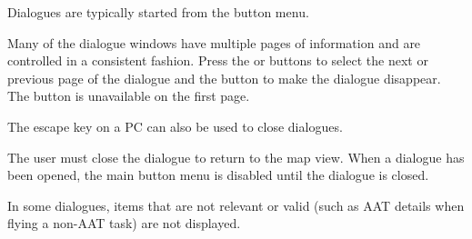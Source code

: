 Dialogues are typically started from the button menu.  

Many of the dialogue windows have multiple pages of information and are controlled
in a consistent fashion. Press the \bmenuw{$<$} or \bmenuw{$>$} buttons to
select the next or previous page of the dialogue and the  button 
to make the dialogue disappear. The \bmenuw{$<$} button is unavailable
on the first page.

The escape key on a PC can also be used to close dialogues.

The user must close the dialogue to return to the map view. When a dialogue
has been opened, the main button menu is disabled until the dialogue is closed.

In some dialogues, items that are not relevant or valid (such as AAT details when
flying a non-AAT task) are not displayed.

